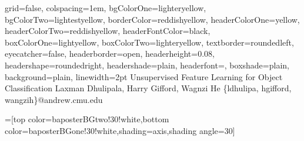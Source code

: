 \documentclass[a0paper,landscape,final]{baposter}
\begin{document}
\begin{poster}{
  grid=false,
  colspacing=1em,
  bgColorOne=lighteryellow,
  bgColorTwo=lightestyellow,
  borderColor=reddishyellow,
  headerColorOne=yellow,
  headerColorTwo=reddishyellow,
  headerFontColor=black,
  boxColorOne=lightyellow,
  boxColorTwo=lighteryellow,
  textborder=roundedleft,
  eyecatcher=false,
  headerborder=open,
  headerheight=0.08\textheight,
  headershape=roundedright,
  headershade=plain,
  headerfont=\Large\textsf, %
  boxshade=plain,
  background=plain,
  linewidth=2pt
  }
  {} %
  {\sf %
  \vspace{0.5em}
  Unsupervised Feature Learning for Object Classification
  \vspace{0.2em}
  }
  {\sf %
  Laxman Dhulipala, Harry Gifford, Wagnzi He\hspace{3em}
  \{ldhulipa, hgifford, wangzih\}@andrew.cmu.edu\hspace{3em}
  }
  {{\begin{minipage}{25em}
    \hfill
  \end{minipage}}
  }

  =[top color=baposterBGtwo!30!white,bottom color=baposterBGone!30!white,shading=axis,shading angle=30]

     \newlength{\leftimgwidth}
     \setlength{\leftimgwidth}{0.78em+8.0em}

    \newcommand{\colouredcircle}[1]{%
      \tikz{\useasboundingbox (-0.2em,-0.32em) rectangle(0.2em,0.32em); \draw[draw=black,fill=baposterBGone!80!black!#1!white,line width=0.03em] (0,0) circle(0.18em);}}


\end{poster}
\end{document}
